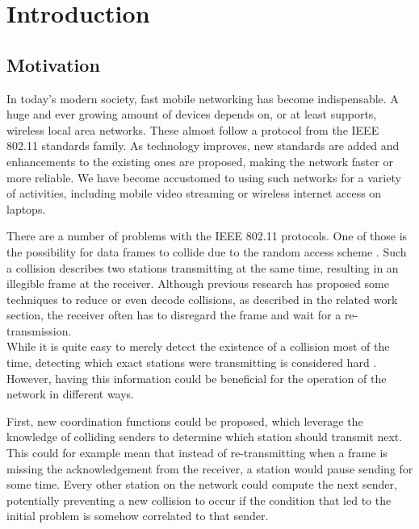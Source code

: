 \chapter{Introduction}\label{ch:introduction}
\glsresetall %



\section{Motivation}

In today's modern society, fast mobile networking has become indispensable. A huge and ever growing amount of devices depends on, or at least supports, wireless local area networks. These almost follow a protocol from the IEEE 802.11 standards family. As technology improves, new standards are added and enhancements to the existing ones are proposed, making the network faster or more reliable. We have become accustomed to using such networks for a variety of activities, including mobile video streaming or wireless internet access on laptops.

There are a number of problems with the IEEE 802.11 protocols. One of those is the possibility for data frames to collide due to the random access scheme \cite{bianchi2000}. Such a collision describes two stations transmitting at the same time, resulting in an illegible frame at the receiver. Although previous research has proposed some techniques to reduce or even decode collisions, as described in the related work section, the receiver often has to disregard the frame and wait for a re-transmission.\\

While it is quite easy to merely detect the existence of a collision most of the time, detecting which exact stations were transmitting is considered hard \cite{choi2013,keene2010}. However, having this information could be beneficial for the operation of the network in different ways.

First, new coordination functions could be proposed, which leverage the knowledge of colliding senders to determine which station should transmit next. This could for example mean that instead of re-transmitting when a frame is missing the acknowledgement from the receiver, a station would pause sending for some time. Every other station on the network could compute the next sender, potentially preventing a new collision to occur if the condition that led to the initial problem is somehow correlated to that sender.

